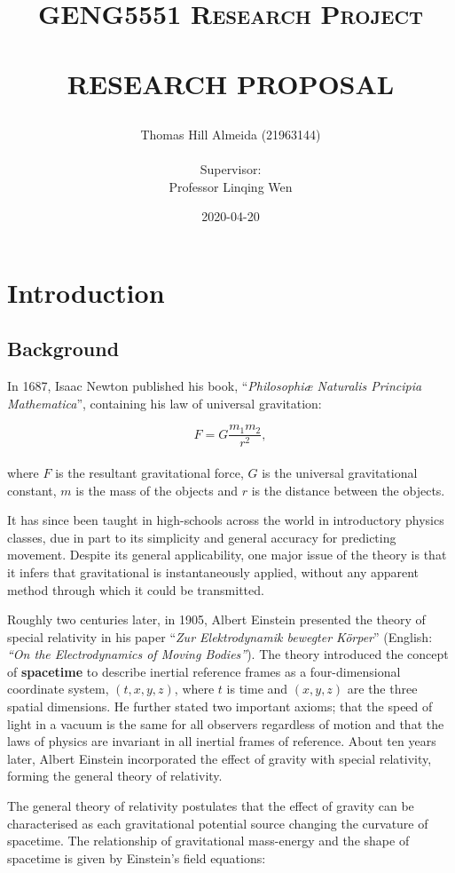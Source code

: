 \documentclass{article}
\title{\normalsize \textsc{GENG5551 Research Project}
        \\ [1.5cm]
        \HRule{0.5pt} \\
        \LARGE \textbf{\uppercase{Research Proposal}}
        \HRule{2pt} \\ [0.5cm]
        \normalsize \date{2020-04-20} \vspace*{3\baselineskip}}
\author{Thomas Hill Almeida (21963144)\\
\\
Supervisor:\\
Professor Linqing Wen
}
\date{}
\begin{document}
\maketitle{}
\tableofcontents{}
\newpage{}

\section{Introduction}
\subsection{Background}

In 1687, Isaac Newton published his book, ``\textit{Philosophi\ae{} Naturalis Principia
Mathematica}'', containing his law of universal gravitation:

\begin{equation}
    F = G\dfrac{m_1m_2}{r^2},
\end{equation}
\\
where \(F\) is the resultant gravitational force, \(G\) is the universal gravitational constant,
\(m\) is the mass of the objects and \(r\) is the distance between the objects.

It has since been taught in high-schools across the world in introductory physics classes, due in
part to its simplicity and general accuracy for predicting movement. Despite its general
applicability, one major issue of the theory is that it infers that gravitational is instantaneously
applied, without any apparent method through which it could be transmitted.

Roughly two centuries later, in 1905, Albert Einstein presented the theory of special relativity
in his paper ``\textit{Zur Elektrodynamik bewegter K{\"o}rper}'' (English: \textit{``On the
Electrodynamics of Moving Bodies''}). The theory introduced the concept of \textbf{spacetime} to
describe inertial reference frames as a four-dimensional coordinate system, \((t, x, y, z)\), where
$t$ is time and \((x, y, z)\) are the three spatial dimensions. He further stated two important
axioms; that the speed of light in a vacuum is the same for all observers regardless of motion and
that the laws of physics are invariant in all inertial frames of reference. About ten years later,
Albert Einstein incorporated the effect of gravity with special relativity, forming the general
theory of relativity.

The general theory of relativity postulates that the effect of gravity can be characterised as each
gravitational potential source changing the curvature of spacetime. The relationship of
gravitational mass-energy and the shape of spacetime is given by Einstein's field equations:
\end{document}
